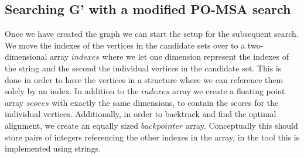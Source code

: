 \documentclass[thesis.tex]{subfiles}
\begin{document}
\subsection{Searching G' with a modified PO-MSA search}
Once we have created the graph we can start the setup for the subsequent search. We move the indexes of the vertices in the candidate sets over to a two-dimensional array $indexes$ where we let one dimension represent the indexes of the string and the second the individual vertices in the candidate set. This is done in order to have the vertices in a structure where we can reference them solely by an index. In addition to the $indexes$ array we create a floating point array $scores$ with exactly the same dimensions, to contain the scores for the individual vertices. Additionally, in order to backtrack and find the optimal alignment, we create an equally sized $backpointer$ array. Conceptually this should store pairs of integers referencing the other indexes in the array, in the tool this is implemented using strings.
\par\noindent
\end{document}
